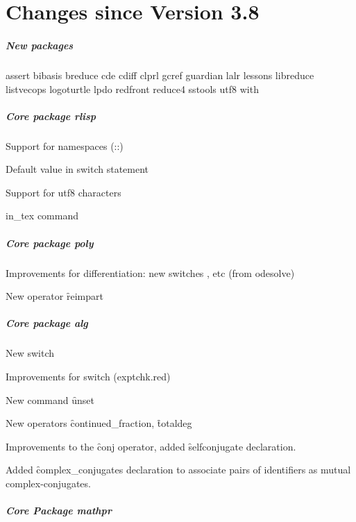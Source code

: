 \chapter{Changes since Version 3.8}

\paragraph*{New packages}

assert
bibasis
breduce
cde
cdiff
clprl
gcref
guardian
lalr
lessons
libreduce
listvecops
logoturtle
lpdo
redfront
reduce4
sstools
utf8
with

\paragraph*{Core package rlisp}

Support for namespaces (::)

Default value in switch statement

Support for utf8 characters

in\_tex command

\paragraph*{Core package poly}

Improvements for differentiation: new switches ,  etc
(from odesolve)

New operator \f{reimpart}

\paragraph*{Core package alg}

New switch 

Improvements for switch  (exptchk.red)

New command \f{unset}

New operators \f{continued\_fraction}, \f{totaldeg}

Improvements to the \f{conj} operator, added \f{selfconjugate} declaration.

Added \f{complex\_conjugates} declaration to associate pairs of identifiers
as mutual complex-conjugates.

\paragraph*{Core Package mathpr}

